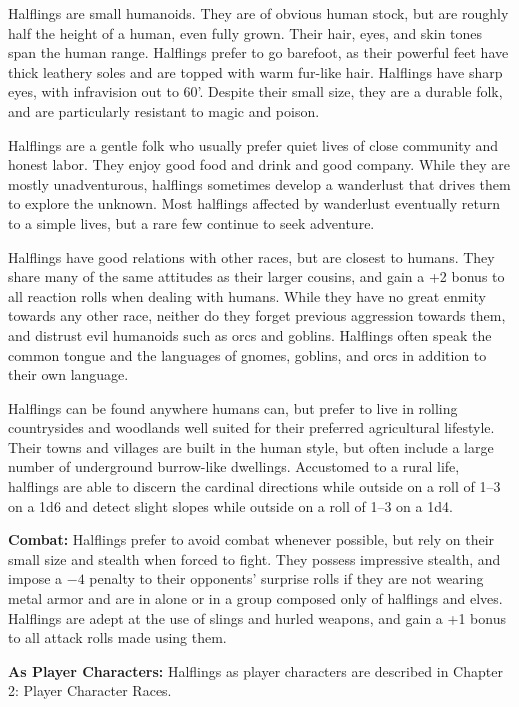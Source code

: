 \begin{multicols}{2}
\begin{minipage}{\columnwidth}
\end{minipage}

Halflings are small humanoids. They are of obvious human stock, but are roughly half the height of a human, even fully grown. Their hair, eyes, and skin tones span the human range. Halflings prefer to go barefoot, as their powerful feet have thick leathery soles and are topped with warm fur-like hair. Halflings have sharp eyes, with infravision out to 60'. Despite their small size, they are a durable folk, and are particularly resistant to magic and poison.

Halflings are a gentle folk who usually prefer quiet lives of close community and honest labor. They enjoy good food and drink and good company. While they are mostly unadventurous, halflings sometimes develop a wanderlust that drives them to explore the unknown. Most halflings affected by wanderlust eventually return to a simple lives, but a rare few continue to seek adventure.

Halflings have good relations with other races, but are closest to humans. They share many of the same attitudes as their larger cousins, and gain a +2 bonus to all reaction rolls when dealing with humans. While they have no great enmity towards any other race, neither do they forget previous aggression towards them, and distrust evil humanoids such as orcs and goblins. Halflings often speak the common tongue and the languages of gnomes, goblins, and orcs in addition to their own language.

Halflings can be found anywhere humans can, but prefer to live in rolling countrysides and woodlands well suited for their preferred agricultural lifestyle. Their towns and villages are built in the human style, but often include a large number of underground burrow-like dwellings. Accustomed to a rural life, halflings are able to discern the cardinal directions while outside on a roll of 1--3 on a 1d6 and detect slight slopes while outside on a roll of 1--3 on a 1d4.

\textbf{Combat:} Halflings prefer to avoid combat whenever possible, but rely on their small size and stealth when forced to fight. They possess impressive stealth, and impose a $-4$ penalty to their opponents' surprise rolls if they are not wearing metal armor and are in alone or in a group composed only of halflings and elves. Halflings are adept at the use of slings and hurled weapons, and gain a +1 bonus to all attack rolls made using them.

\textbf{As Player Characters:} Halflings as player characters are described in Chapter 2: Player Character Races.


\end{multicols}

